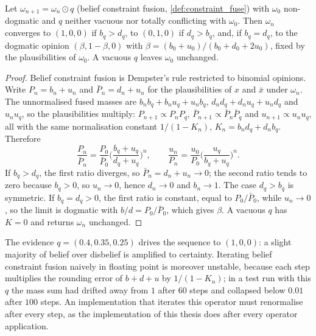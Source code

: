 \begin{theorem}\label{thm:bcf}
Let $\omega_{n+1} = \omega_n \odot q$ (belief constraint fusion, \cref{def:constraint_fuse}) with $\omega_0$ non-dogmatic and $q$ neither vacuous nor totally conflicting with $\omega_0$. Then $\omega_n$ converges to $(1, 0, 0)$ if $b_q > d_q$, to $(0, 1, 0)$ if $d_q > b_q$, and, if $b_q = d_q$, to the dogmatic opinion $(\beta, 1 - \beta, 0)$ with $\beta = (b_0 + u_0)/(b_0 + d_0 + 2 u_0)$, fixed by the plausibilities of $\omega_0$. A vacuous $q$ leaves $\omega_0$ unchanged.
\end{theorem}
\begin{proof}
Belief constraint fusion is Dempster's rule restricted to binomial opinions. Write $P_n = b_n + u_n$ and $\bar P_n = d_n + u_n$ for the plausibilities of $x$ and $\bar x$ under $\omega_n$. The unnormalised fused masses are $b_n b_q + b_n u_q + u_n b_q$, $d_n d_q + d_n u_q + u_n d_q$ and $u_n u_q$, so the plausibilities multiply: $P_{n+1} \propto P_n P_q$, $\bar P_{n+1} \propto \bar P_n \bar P_q$ and $u_{n+1} \propto u_n u_q$, all with the same normalisation constant $1/(1 - K_n)$, $K_n = b_n d_q + d_n b_q$. Therefore
\[
\frac{P_n}{\bar P_n} = \frac{P_0}{\bar P_0}\Big(\frac{b_q + u_q}{d_q + u_q}\Big)^{n}, \qquad
\frac{u_n}{P_n} = \frac{u_0}{P_0}\Big(\frac{u_q}{b_q + u_q}\Big)^{n}.
\]
If $b_q > d_q$, the first ratio diverges, so $\bar P_n = d_n + u_n \to 0$; the second ratio tends to zero because $b_q > 0$, so $u_n \to 0$, hence $d_n \to 0$ and $b_n \to 1$. The case $d_q > b_q$ is symmetric. If $b_q = d_q > 0$, the first ratio is constant, equal to $P_0/\bar P_0$, while $u_n \to 0$, so the limit is dogmatic with $b/d = P_0/\bar P_0$, which gives $\beta$. A vacuous $q$ has $K = 0$ and returns $\omega_n$ unchanged.
\end{proof}

\begin{remark}\label{rem:bcf-numerics}
The evidence $q = (0.4, 0.35, 0.25)$ drives the sequence to $(1, 0, 0)$: a slight majority of belief over disbelief is amplified to certainty. Iterating belief constraint fusion naively in floating point is moreover unstable, because each step multiplies the rounding error of $b + d + u$ by $1/(1 - K_n)$; in a test run with this $q$ the mass sum had drifted away from $1$ after $60$ steps and collapsed below $0.01$ after $100$ steps. An implementation that iterates this operator must renormalise after every step, as the implementation of this thesis does after every operator application.
\end{remark}

